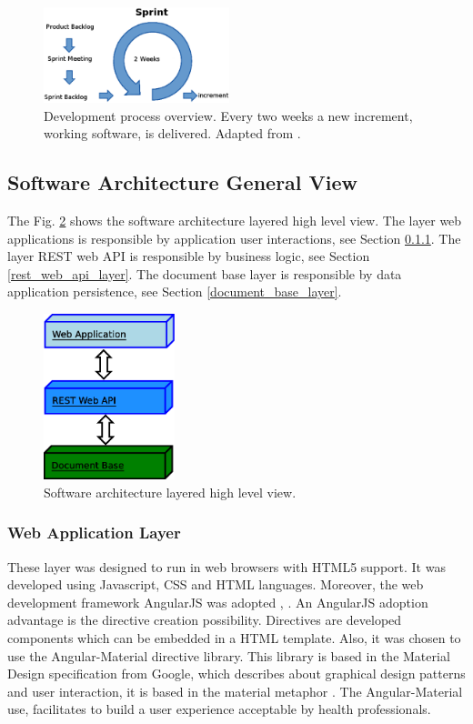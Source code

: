 \documentclass[journal]{IEEEtran}
\begin{document}
\begin{figure}[!t]
	\centering
	\includegraphics[width=0.48\textwidth]{img/dev_proc.eps}
	\caption{Development process overview.
		Every two weeks a new increment, working software, is delivered.
		Adapted from \cite{Schwaber2004}.
	}
	\label{dev_proc}
\end{figure}

\subsection{Software Architecture General View}
The Fig. \ref{app_layers} shows the software architecture layered high level view.
The layer web applications is responsible by application user interactions, see Section \ref{web_application_layer}.
The layer REST web API is responsible by business logic, see Section \ref{rest_web_api_layer}.
The document base layer is responsible by data application persistence, see Section \ref{document_base_layer}.
\begin{figure}[!t]
	\centering
	\includegraphics[width=1.5in]{img/app_layers.eps}
	\caption{Software architecture layered high level view.
	}
	\label{app_layers}
\end{figure}

\subsubsection{Web Application Layer}
\label{web_application_layer}

These layer was designed to run in web browsers with HTML5 support.
It was developed using Javascript, CSS and HTML languages. 
Moreover, the web development framework AngularJS was adopted \cite{Branas2014}, \cite{Freeman2014}. 
An AngularJS adoption advantage is the directive creation possibility. 
Directives are developed components which can be embedded in a HTML template.
Also, it was chosen to use the Angular-Material directive library. 
This library is based in the Material Design specification from Google, which
describes about graphical design patterns and user interaction, it is based in the material metaphor
\cite{Google2015a}. The Angular-Material use, facilitates to build a user experience acceptable by 
health professionals.
\end{document}
